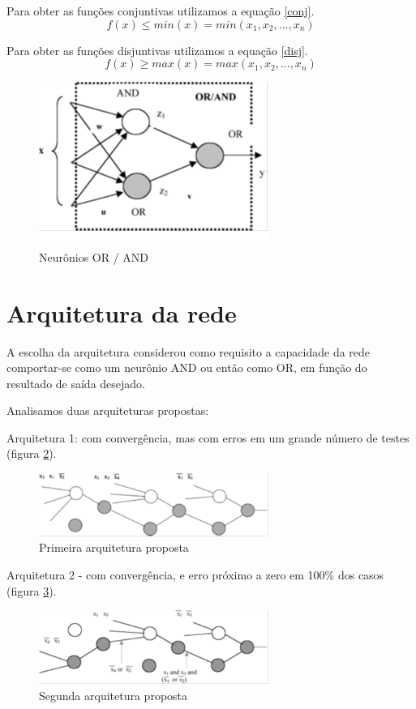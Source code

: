 \documentclass{IEEEtran}
\begin{document}
Para obter as funções conjuntivas utilizamos a equação \ref{conj}.
\begin{equation} \label{conj}
  f(x) \leq min(x) = min(x_1,x_2, ..., x_n)
\end{equation}

Para obter as funções disjuntivas utilizamos a equação \ref{disj}.
\begin{equation} \label{disj}
  f(x) \geq max(x) = max(x_1,x_2, ..., x_n)
\end{equation}

\begin{figure}[ht!]
	\centering
	\includegraphics{or-and.png}
	\caption{Neurônios OR / AND}
	\label{neur}
\end{figure}

\section{Arquitetura da rede}
A escolha da arquitetura considerou como requisito a capacidade da rede comportar-se como um neurônio AND ou então como OR, em função do resultado de saída desejado. 

Analisamos duas arquiteturas propostas:

Arquitetura 1: com convergência,  mas com erros em um grande número de testes (figura \ref{arq1}).
\begin{figure}[ht!]
	\centering
	\includegraphics[width=75mm]{arq1.png}
	\caption{Primeira arquitetura proposta}
	\label{arq1}
\end{figure}

Arquitetura 2  - com convergência, e erro próximo a zero em 100\% dos casos (figura \ref{arq2}). 
\begin{figure}[ht!]
	\centering
	\includegraphics[width=75mm]{arq2.png}
	\caption{Segunda arquitetura proposta}
	\label{arq2}
\end{figure}
\end{document}
